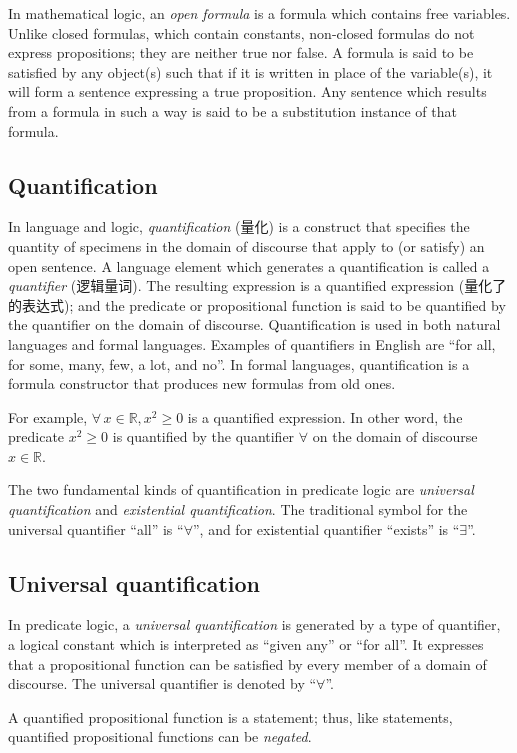 \documentclass{book}
\newcommand{\Any}{\forall\,}
\newcommand{\R}{\mathbb{R}}
\renewcommand{\ge}{\geqslant}
\numberwithin{equation}{section}
\numberwithin{figure}{section}
\theoremstyle{definition}
\newcommand{\dq}[1]{``#1''}
\begin{document}
In mathematical logic, an \emph{open formula} is a formula which contains free variables. Unlike closed formulas, which contain constants, non-closed formulas do not express propositions; they are neither true nor false. A formula is said to be satisfied by any object(s) such that if it is written in place of the variable(s), it will form a sentence expressing a true proposition. Any sentence which results from a formula in such a way is said to be a substitution instance of that formula.

\subsection{Quantification}
In language and logic, \emph{quantification} (量化) is a construct that specifies the quantity of specimens in the domain of discourse that apply to (or satisfy) an open sentence. A language element which generates a quantification is called a \emph{quantifier} (逻辑量词). The resulting expression is a quantified expression (量化了的表达式); and the predicate or propositional function is said to be quantified by the quantifier on the domain of discourse. Quantification is used in both natural languages and formal languages. Examples of quantifiers in English are \dq{for all, for some, many, few, a lot, and no}. In formal languages, quantification is a formula constructor that produces new formulas from old ones.

For example, $\Any x\in\R,x^2\ge0$ is a quantified expression. In other word, the predicate $x^2\ge0$ is quantified by the quantifier $\forall$ on the domain of discourse $x\in\R$.

The two fundamental kinds of quantification in predicate logic are \emph{universal quantification} and \emph{existential quantification}. The traditional symbol for the universal quantifier ``all'' is ``$\forall$'', and for existential quantifier ``exists'' is ``$\exists$''.

\subsection{Universal quantification}
In predicate logic, a \emph{universal quantification} is generated by a type of quantifier, a logical constant which is interpreted as ``given any'' or ``for all''.  It expresses that a propositional function can be satisfied by every member of a domain of discourse.
The universal quantifier is denoted by \dq{$\forall$}.

A quantified propositional function is a statement; thus, like statements, quantified propositional functions can be \emph{negated}.
\end{document}
